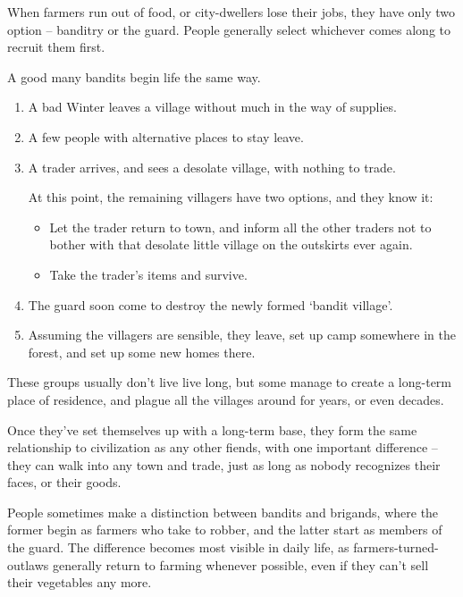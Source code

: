 \begin{multicols}{2}

When farmers run out of food, or city-dwellers lose their jobs, they have only two option -- banditry or the \gls{guard}.
People generally select whichever comes along to recruit them first.

A good many bandits begin life the same way.

\begin{enumerate}
  \item
  A bad Winter leaves a \gls{village} without much in the way of supplies.
  \item
  A few people with alternative places to stay leave.
  \item
  A trader arrives, and sees a desolate \gls{village}, with nothing to trade.

  At this point, the remaining villagers have two options, and they know it:
  \begin{itemize}
    \item
    Let the trader return to town, and inform all the other traders not to bother with that desolate little \gls{village} on the outskirts ever again.
    \item
    Take the trader's items and survive.
  \end{itemize}
  \item
  The \gls{guard} soon come to destroy the newly formed `bandit \gls{village}'.
  \item
  Assuming the villagers are sensible, they leave, set up camp somewhere in the forest, and set up some new homes there.
\end{enumerate}

\noindent
These groups usually don't live live long, but some manage to create a long-term place of residence, and plague all the \glspl{village} around for years, or even decades.

Once they've set themselves up with a long-term base, they form the same relationship to civilization as any other fiends, with one important difference -- they can walk into any town and trade, just as long as nobody recognizes their faces, or their goods.

People sometimes make a distinction between bandits and brigands, where the former begin as farmers who take to robber, and the latter start as members of the \gls{guard}.
The difference becomes most visible in daily life, as farmers-turned-outlaws generally return to farming whenever possible, even if they can't sell their vegetables any more.


\end{multicols}

